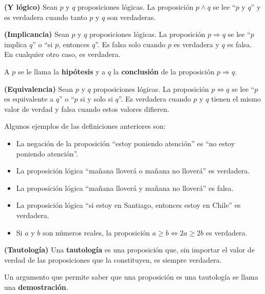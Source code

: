 \begin{definicion}
	\textbf{(Y lógico)} 
	Sean $p$ y $q$ proposiciones lógicas. La proposición $p \wedge q$ se lee ``$p$ y $q$'' y es verdadera cuando tanto $p$ y $q$ son verdaderas. 
\end{definicion}

\begin{definicion}
	\textbf{(Implicancia)}
	Sean $p$ y $q$ proposiciones lógicas. La proposición $p \Rightarrow q$ se lee ``$p$ implica $q$'' o ``si $p$, entonces $q$''. Es falsa solo cuando $p$ es verdadera y $q$ es falsa. En cualquier otro caso, es verdadera. 
	
	A $p$ se le llama la \textbf{hipótesis} y a $q$ la \textbf{conclusión} de la proposición $p\Rightarrow q$. 
\end{definicion}

\begin{definicion}
	\textbf{(Equivalencia)}
	Sean $p$ y $q$ proposiciones lógicas. La proposición $p\Leftrightarrow q$ se lee ``$p$ es equivalente a $q$'' o ``$p$ si y solo si $q$''. Es verdadera cuando $p$ y $q$ tienen el mismo valor de verdad y falsa cuando estos valores difieren. 
\end{definicion}

\begin{ejemplo}
	Algunos ejemplos de las definiciones anteriores son: 
	\begin{itemize}
		\item La negación de la proposición ``estoy poniendo atención'' es ``no estoy poniendo atención''. 
		\item La proposición lógica ``mañana lloverá o mañana no lloverá'' es verdadera.  
		\item La proposición lógica ``mañana lloverá y mañana no lloverá'' es falsa. 
		\item La proposición lógica ``si estoy en Santiago, entonces estoy en Chile'' es verdadera.
		\item Si $a$ y $b$ son números reales, la proposición $a \geq b \Longleftrightarrow 2a \geq 2b$ es verdadera. 
	\end{itemize}
\end{ejemplo}

\begin{definicion}
	\textbf{(Tautología)}
	Una \textbf{tautología} es una proposición que, sin importar el valor de verdad de las proposiciones que la constituyen, es siempre verdadera. 
	
	Un argumento que permite saber que una proposición es una tautología se llama una \textbf{demostración}. 
\end{definicion}

